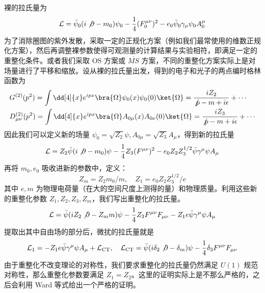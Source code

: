 

裸的拉氏量为
\begin{equation}
\begin{aligned}
\mathcal{L}=
\bar{\psi}_0 (i\not\partial -m_0)\psi_0 -\frac{1}{4}(F_0^{\mu\nu})^2 - e_0\bar\psi_0 \gamma_\mu\psi_0 A_0^\mu
\end{aligned}
\end{equation}
为了消除圈图的紫外发散，采取一定的正规化方案（例如我们最常使用的维数正规化方案），然后再调整裸参数使得可观测量的计算结果与实验相符，即满足一定的重整化条件。或者我们采取 OS 方案或 $\overline{MS}$ 方案，不同的重整化方案实际上是对场量进行了平移和缩放。设从裸的拉氏量出发，得到的电子和光子的两点编时格林函数为
\begin{equation}
\begin{aligned}
&G^{(2)}(p^2)=\int\dd[4]{x} e^{ipx} \bra{\Omega}\psi_0(x)\psi_0(0)\ket{\Omega}=\frac{iZ_2}{\not p-m+i\epsilon} + \cdots\\
&D_{\mu\nu}^{(2)}(p^2)=\int\dd[4]{x} e^{ipx} \bra{\Omega}A_{0\mu}(x)A_{0\nu}(0)\ket{\Omega}=\frac{iZ_3}{\not p-m+i\epsilon}+\cdots
\end{aligned}
\end{equation}
因此我们可以定义新的场量 $\psi_0=\sqrt{Z_2} \psi,A_{0\mu} = \sqrt{Z_3} A_\mu$，得到新的拉氏量
\begin{equation}
\mathcal{L} = Z_2\bar\psi (i\not\partial - m_0)\psi - \frac{1}{4}Z_3 (F^{\mu\nu})^2-e_0Z_2Z_3^{1/2} \bar\psi \gamma^\mu\psi A_\mu
\end{equation}
再将 $m_0,e_0$ 吸收进新的参数中，定义：
\begin{equation}
Z_m = Z_2 m_0 / m,\quad Z_1 = e_0Z_2Z_3^{1/2} / e
\end{equation}
其中 $e,m$ 为物理电荷量（在大的空间尺度上测得的量）和物理质量。利用这些新的重整化参数 $Z_1,Z_2,Z_3,Z_m$，我们写出重整化的拉氏量。
\begin{equation}
\begin{aligned}
\mathcal{L} = \bar\psi (iZ_2\not\partial - Z_m m)\psi -\frac{1}{4}Z_3F^{\mu\nu}F_{\mu\nu}-Z_1 e\bar\psi \gamma^\mu \psi A_\mu
\end{aligned}
\end{equation}
提取出其中自由场的部分后，微扰的拉氏量就是
\begin{equation}
\mathcal{L}_1 = - Z_1 e \bar\psi \gamma^\mu\psi A_\mu + \mathcal{L}_\text{CT},\quad \mathcal{L}_\text{CT} = \bar\psi (i\delta_2 \not\partial - \delta_m)\psi - \frac{1}{4}\delta_3 F^{\mu\nu}F_{\mu\nu}
\end{equation}
由于重整化不改变理论的对称性，我们要求重整化的拉氏量仍然满足 $U(1)$ 规范对称性，那么重整化参数要满足 $Z_1=Z_2$。这里的证明实际上是不那么严格的，之后会利用 Ward 等式给出一个严格的证明。

